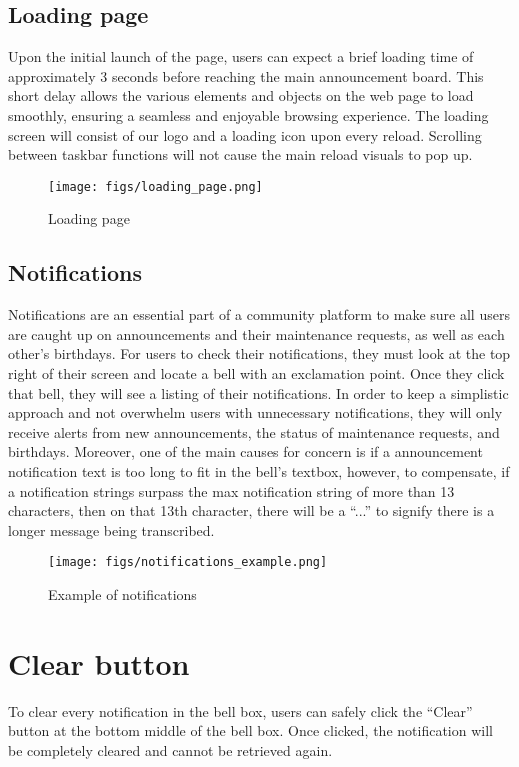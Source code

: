 \documentclass[conference]{IEEEtran}
\begin{document}
\subsection{Loading page}
Upon the initial launch of the page, users can expect a brief loading time of approximately 3 seconds before reaching the main announcement board. This short delay allows the various elements and objects on the web page to load smoothly, ensuring a seamless and enjoyable browsing experience. The loading screen will consist of our logo and a loading icon upon every reload. Scrolling between taskbar functions will not cause the main reload visuals to pop up.
    \begin{figure}[H]
    \centering
    \texttt{[image: figs/loading\_page.png]}
    \caption{Loading page}
    \label{fig:Loading page}
    \end{figure}


\subsection{Notifications}
Notifications are an essential part of a community platform to make sure all users are caught up on announcements and their maintenance requests, as well as each other’s  birthdays. For users to check their notifications, they must look at the top right of their screen and locate a bell with an exclamation point. Once they click that bell, they will see a listing of their notifications. In order to keep a simplistic approach and not overwhelm users with unnecessary notifications, they will only receive alerts from new announcements, the status of maintenance requests, and birthdays. Moreover, one of the main causes for concern is if a announcement notification text is too long to fit in the bell’s textbox, however, to compensate, if a notification strings surpass the max notification string of  more than 13 characters, then on that 13th character, there will be a “...” to signify there is a longer message being transcribed. 
    \begin{figure}[H]
    \centering
    \texttt{[image: figs/notifications\_example.png]}
    \caption{Example of notifications}
    \label{fig:Example of notifications}
    \end{figure}


\section*{Clear button}
To clear every notification in the bell box, users can safely click the “Clear” button at the bottom middle of the bell box. Once clicked, the notification will be completely cleared and  cannot be retrieved again.
\end{document}
